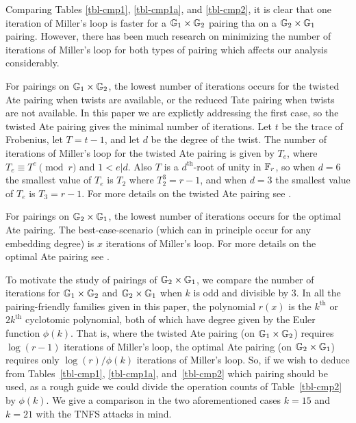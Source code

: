 Comparing Tables \ref{tbl-cmp1}, \ref{tbl-cmp1a}, and \ref{tbl-cmp2}, it is clear that one iteration of Miller's loop is faster for a $\mathbb{G}_{1} \times \mathbb{G}_{2}$ pairing tha on a $\mathbb{G}_{2} \times \mathbb{G}_{1}$ pairing.
However, there has been much research on minimizing the number of iterations of Miller's loop for both types of pairing which affects our analysis considerably.

For pairings on $\mathbb{G}_{1} \times \mathbb{G}_{2}$, the lowest number of iterations occurs for the twisted Ate pairing when twists are available, or the reduced Tate pairing when twists are not available.
In this paper we are explictly addressing the first case, so the twisted Ate pairing gives the minimal number of iterations. 
Let $t$ be the trace of Frobenius, let $T = t-1$, and let $d$ be the degree of the twist. The number of iterations of Miller's loop for the twisted Ate pairing is given by $T_e$, where
$T_e \equiv T^e \pmod{r}$ and $1 < e | d$. 
Also $T$ is a $d^{\text{th}}$-root of unity in $\mathbb{F}_{r}$, so when $d = 6$ the smallest value of
$T_e$ is $T_2$ where $T_2^3= r-1$, and when $d = 3$ the smallest value of $T_e$ is
$T_3 = r-1$. For more details on the twisted Ate pairing see \cite{}.

For pairings on $\mathbb{G}_{2} \times \mathbb{G}_{1}$, the lowest number of iterations occurs for the optimal Ate pairing. The best-case-scenario (which can in principle occur for any embedding degree) is $x$ iterations of Miller's loop. For more details on the optimal Ate pairing see \cite{}. 

To motivate the study of pairings of $\mathbb{G}_{2} \times \mathbb{G}_{1}$, 
we compare the number of iterations for $\mathbb{G}_{1} \times \mathbb{G}_{2}$ and $\mathbb{G}_{2} \times \mathbb{G}_{1}$ when $k$ is odd and divisible by 3. 
In all the pairing-friendly families given in this paper, the polynomial $r(x)$ is the $k^{\text{th}}$ or $2k^{\text{th}}$ cyclotomic polynomial, both of which have degree given by the Euler function $\phi(k)$. 
That is, where the twisted Ate pairing (on $\mathbb{G}_{1} \times \mathbb{G}_{2}$) requires $\log(r-1)$ iterations of Miller's loop,
the optimal Ate pairing (on $\mathbb{G}_{2} \times \mathbb{G}_{1}$) requires only $\log(r)/\phi(k)$ iterations of Miller's loop. 
So, if we wish to deduce from Tables~\ref{tbl-cmp1}, \ref{tbl-cmp1a}, and~\ref{tbl-cmp2} which pairing should be used, as a rough guide we could divide the operation counts of Table~\ref{tbl-cmp2} by $\phi(k)$. We give a comparison in the two aforementioned cases $k=15$ and $k=21$ with the TNFS attacks in mind.

